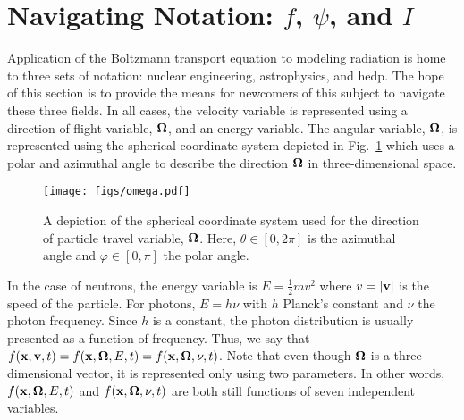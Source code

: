 \documentclass[../doc.tex]{subfiles}
\begin{document}
\section{Navigating Notation: $f$, $\psi$, and $I$}
Application of the Boltzmann transport equation to modeling radiation is home to three sets of notation: nuclear engineering, astrophysics, and \gls{hedp}. The hope of this section is to provide the means for newcomers of this subject to navigate these three fields. In all cases, the velocity variable is represented using a direction-of-flight variable, $\boldsymbol{\Omega}$, and an energy variable. 
The angular variable, $\boldsymbol{\Omega}$, is represented using the spherical coordinate system depicted in Fig.~\ref{trans:omega_diagram} which uses a polar and azimuthal angle to describe the direction $\boldsymbol{\Omega}$ in three-dimensional space. 
\begin{figure}
\centering
\texttt{[image: figs/omega.pdf]}
\caption{A depiction of the spherical coordinate system used for the direction of particle travel variable, $\boldsymbol{\Omega}$. Here, $\theta \in [0,2\pi]$ is the azimuthal angle and $\varphi \in [0,\pi]$ the polar angle. }
\label{trans:omega_diagram}
\end{figure}
In the case of neutrons, the energy variable is $E = \frac{1}{2}mv^2$ where $v = |\boldsymbol{\mathrm{v}}|$ is the speed of the particle. For photons, $E = h\nu$ with $h$ Planck's constant and $\nu$ the photon frequency. Since $h$ is a constant, the photon distribution is usually presented as a function of frequency. Thus, we say that $f(\boldsymbol{\mathrm{x}},\boldsymbol{\mathrm{v}},t) = f(\boldsymbol{\mathrm{x}},\boldsymbol{\Omega},E,t) = f(\boldsymbol{\mathrm{x}},\boldsymbol{\Omega},\nu,t)$. Note that even though $\boldsymbol{\Omega}$ is a three-dimensional vector, it is represented only using two parameters. In other words, $f(\boldsymbol{\mathrm{x}},\boldsymbol{\Omega},E,t)$ and $f(\boldsymbol{\mathrm{x}},\boldsymbol{\Omega},\nu,t)$ are both still functions of seven independent variables. 
\end{document}
